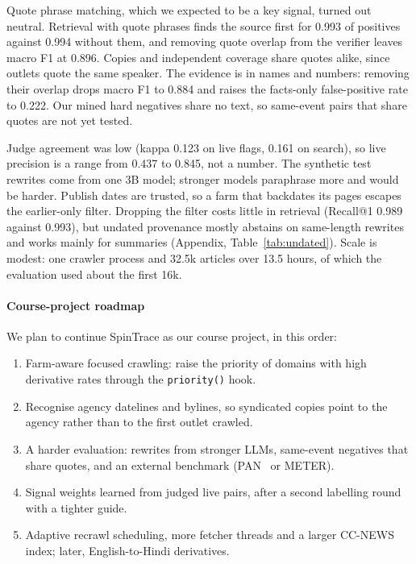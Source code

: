 \documentclass[11pt,a4paper]{article}
\newcommand{\code}[1]{\texttt{#1}}
\begin{document}
Quote phrase matching, which we expected to be a key signal, turned out neutral. Retrieval with quote phrases finds the source first for 0.993 of positives against 0.994 without them, and removing quote overlap from the verifier leaves macro F1 at 0.896. Copies and independent coverage share quotes alike, since outlets quote the same speaker. The evidence is in names and numbers: removing their overlap drops macro F1 to 0.884 and raises the facts-only false-positive rate to 0.222. Our mined hard negatives share no text, so same-event pairs that share quotes are not yet tested.

Judge agreement was low (kappa 0.123 on live flags, 0.161 on search), so live precision is a range from 0.437 to 0.845, not a number. The synthetic test rewrites come from one 3B model; stronger models paraphrase more and would be harder. Publish dates are trusted, so a farm that backdates its pages escapes the earlier-only filter. Dropping the filter costs little in retrieval (Recall@1 0.989 against 0.993), but undated provenance mostly abstains on same-length rewrites and works mainly for summaries (Appendix, Table~\ref{tab:undated}). Scale is modest: one crawler process and 32.5k articles over 13.5 hours, of which the evaluation used about the first 16k.

\paragraph{Course-project roadmap} We plan to continue SpinTrace as our course project, in this order:
\begin{enumerate}
  \item Farm-aware focused crawling: raise the priority of domains with high derivative rates through the \code{priority()} hook.
  \item Recognise agency datelines and bylines, so syndicated copies point to the agency rather than to the first outlet crawled.
  \item A harder evaluation: rewrites from stronger LLMs, same-event negatives that share quotes, and an external benchmark (PAN~\cite{potthast2010} or METER).
  \item Signal weights learned from judged live pairs, after a second labelling round with a tighter guide.
  \item Adaptive recrawl scheduling, more fetcher threads and a larger CC-NEWS index; later, English-to-Hindi derivatives.
\end{enumerate}
\end{document}
